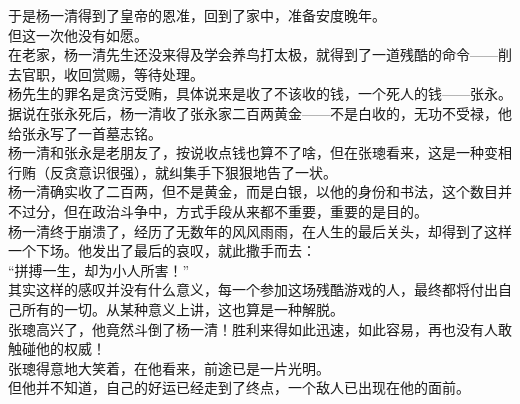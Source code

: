 \begin{multicols}{\theparacolNo}
于是杨一清得到了皇帝的恩准，回到了家中，准备安度晚年。\\

但这一次他没有如愿。\\

在老家，杨一清先生还没来得及学会养鸟打太极，就得到了一道残酷的命令——削去官职，收回赏赐，等待处理。\\

杨先生的罪名是贪污受贿，具体说来是收了不该收的钱，一个死人的钱——张永。\\

据说在张永死后，杨一清收了张永家二百两黄金——不是白收的，无功不受禄，他给张永写了一首墓志铭。\\

杨一清和张永是老朋友了，按说收点钱也算不了啥，但在张璁看来，这是一种变相行贿（反贪意识很强），就纠集手下狠狠地告了一状。\\

杨一清确实收了二百两，但不是黄金，而是白银，以他的身份和书法，这个数目并不过分，但在政治斗争中，方式手段从来都不重要，重要的是目的。\\

杨一清终于崩溃了，经历了无数年的风风雨雨，在人生的最后关头，却得到了这样一个下场。他发出了最后的哀叹，就此撒手而去：\\

“拼搏一生，却为小人所害！”\\

其实这样的感叹并没有什么意义，每一个参加这场残酷游戏的人，最终都将付出自己所有的一切。从某种意义上讲，这也算是一种解脱。\\

张璁高兴了，他竟然斗倒了杨一清！胜利来得如此迅速，如此容易，再也没有人敢触碰他的权威！\\

张璁得意地大笑着，在他看来，前途已是一片光明。\\

但他并不知道，自己的好运已经走到了终点，一个敌人已出现在他的面前。\\
\ifnum{}
	\end{multicols}
\fi
\newpage
